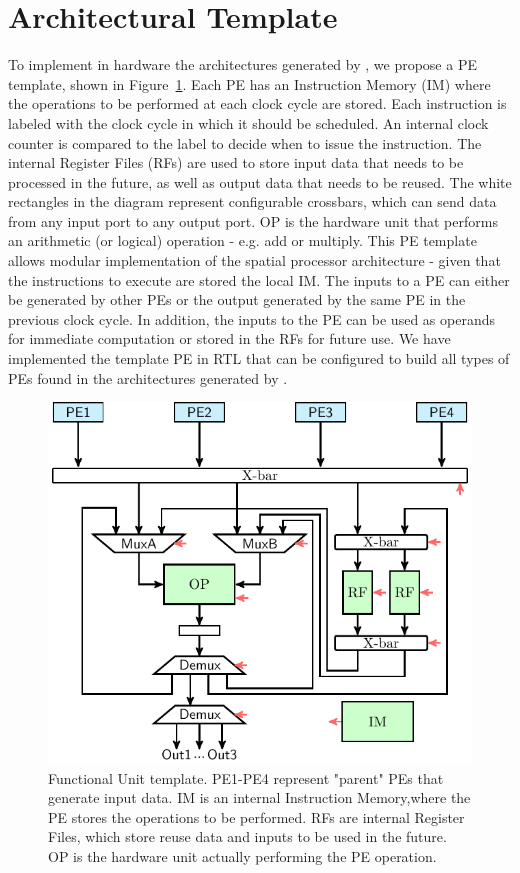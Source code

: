 \vspace{-2mm}
\section{Architectural Template}
\label{sec:arch_template}
To implement in hardware the architectures generated by \frameworkname, we propose a PE template, shown in Figure~\ref{fig:FU_templ}. Each PE has an Instruction Memory (IM) where the operations to be performed at each clock cycle are stored. Each instruction is labeled with the clock cycle in which it should be scheduled. An internal clock counter is compared to the label to decide when to issue the instruction. The internal Register Files (RFs) are used to store input data that needs to be processed in the future, as well as output data that needs to be reused. The white rectangles in the diagram represent configurable crossbars, which can send data from any input port to any output port. OP is the hardware unit that performs an arithmetic (or logical) operation - e.g. add or multiply.
This PE template allows modular implementation of the spatial processor architecture - given that the instructions to execute are stored the local IM. The inputs to a PE can either be generated by other PEs or the output generated by the same PE in the previous clock cycle. In addition, the inputs to the PE can be used as operands for immediate computation or stored in the RFs for future use. We have implemented the template PE in RTL that can be configured to build all types of PEs found in the architectures generated by \frameworkname.

\begin{figure}[tb]
\centering
\includegraphics[width=.7\columnwidth]{images/functional_unit.pdf}
    \caption{\small Functional Unit template. PE1-PE4 represent "parent" PEs that generate input data. IM is an internal Instruction Memory,where the PE stores the operations to be performed. RFs are internal Register Files, which store reuse data and inputs to be used in the future. OP is the hardware unit actually performing the PE operation.}
\label{fig:FU_templ}
\end{figure}
